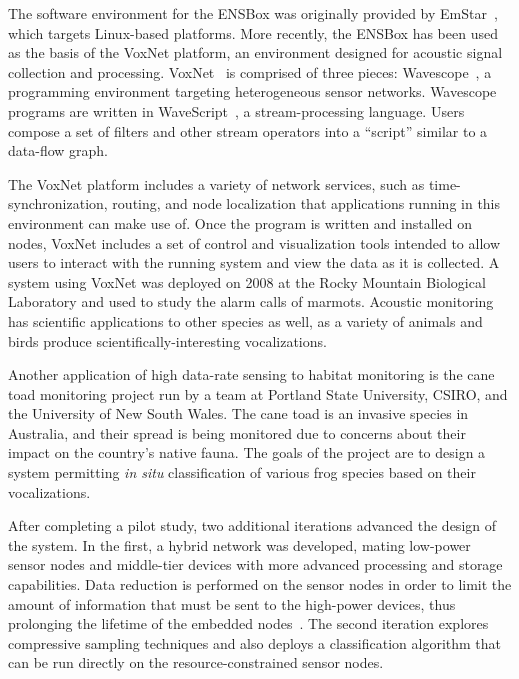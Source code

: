 The software environment for the ENSBox was originally provided by
EmStar~\cite{emstar}, which targets Linux-based platforms. More recently, the
ENSBox has been used as the basis of the VoxNet platform, an environment
designed for acoustic signal collection and processing.
VoxNet~\cite{voxnet-ipsn08} is comprised of three pieces:
Wavescope~\cite{wavescope}, a programming environment targeting
heterogeneous sensor networks. Wavescope programs are written in
WaveScript~\cite{wavescript-techreport08}, a stream-processing language.
Users compose a set of filters and other stream operators into a ``script''
similar to a data-flow graph.

The VoxNet platform includes a variety of network services, such as
time-synchronization, routing, and node localization that applications
running in this environment can make use of. Once the program is written and
installed on nodes, VoxNet includes a set of control and visualization tools
intended to allow users to interact with the running system and view the data
as it is collected. A system using VoxNet was deployed on 2008 at the Rocky
Mountain Biological Laboratory and used to study the alarm calls of marmots.
Acoustic monitoring has scientific applications to other species as well, as
a variety of animals and birds produce scientifically-interesting
vocalizations.

Another application of high data-rate sensing to habitat monitoring is the
cane toad monitoring project run by a team at Portland State University,
CSIRO, and the University of New South Wales. The cane toad is an invasive
species in Australia, and their spread is being monitored due to concerns
about their impact on the country's native fauna. The goals of the project
are to design a system permitting \textit{in situ} classification of various
frog species based on their vocalizations.

After completing a pilot study, two additional iterations advanced the design
of the system. In the first, a hybrid network was developed, mating low-power
sensor nodes and middle-tier devices with more advanced processing and
storage capabilities. Data reduction is performed on the sensor nodes in
order to limit the amount of information that must be sent to the high-power
devices, thus prolonging the lifetime of the embedded
nodes~\cite{canetoad-tosn}. The second iteration explores compressive
sampling techniques and also deploys a classification algorithm that can be
run directly on the resource-constrained sensor nodes.

